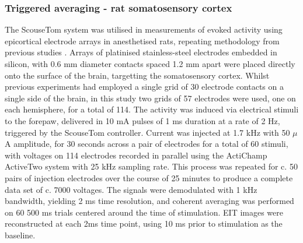 \subsubsection{Triggered averaging - rat somatosensory cortex}
\label{MTrig}
The ScouseTom system was utilised in measurements of evoked activity using epicortical electrode arrays in anesthetised rats, repeating methodology from previous studies \cite{Aristovich_2016} \cite{Vongerichten_2016}. Arrays of platinised stainless-steel electrodes embedded in silicon, with 0.6 mm diameter contacts spaced 1.2 mm apart were placed directly onto the surface of the brain, targetting the somatosensory cortex. Whilst previous experiments had employed a single grid of 30 electrode contacts on a single side of the brain, in this study two grids of 57 electrodes were used, one on each hemisphere, for a total of 114. The activity was induced via electrical stimuli to the forepaw, delivered in 10 mA pulses of 1 ms duration at a rate of 2 Hz, triggered by the ScouseTom controller. Current was injected at 1.7 kHz with 50 $\mu$A amplitude, for 30 seconds across a pair of electrodes for a total of 60 stimuli, with voltages on 114 electrodes recorded in parallel using the ActiChamp ActiveTwo system with 25 kHz sampling rate. This process was repeated for c. 50 pairs of injection electrodes over the course of 25 minutes to produce a complete data set of c. 7000 voltages. The signals were demodulated with 1 kHz bandwidth, yielding 2 ms time resolution, and coherent averaging was performed on 60 500 ms trials centered around the time of stimulation. EIT images were reconstructed at each 2ms time point, using 10 ms prior to stimulation as the baseline. 
